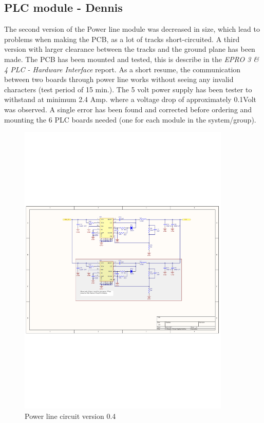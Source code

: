 \subsection{PLC module - Dennis}
The second version of the Power line module was decreased in size, which lead to problems when making the PCB, as a lot of tracks short-circuited. A third version with larger clearance between the tracks and the ground plane has been made. The PCB has been mounted and tested, this is describe in the \textit{EPRO 3 \& 4 PLC - Hardware Interface} report. As a short resume, the communication between two boards through power line works without seeing any invalid characters (test period of 15 min.). The 5 volt power supply has been tester to withstand at minimum 2.4 Amp. where a voltage drop of approximately 0.1Volt was observed. 
A single error has been found and corrected before ordering and mounting the 6 PLC boards needed (one for each module in the system/group).

\begin{figure}[H]
	\begin{centering}
		 \includegraphics[width=0.9\textwidth,page=2,angle=0]{images/SIG60_v0_4}
		\caption{Power line circuit version 0.4}
	\end{centering}
\end{figure}

